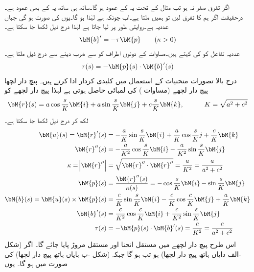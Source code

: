 اگر تفرق  صفر نہ ہو تب مثال  کے تحت یہ  کے عمود ہو گا۔ساتھ ہی ساتھ یہ  کے بھی عمود ہے۔درحقیقت اگر ہم  کا تفرق لیں تو ہمیں  ملتا ہے۔اب چونکہ  ہے لہٰذا  ہو گا۔یوں  کی صورت  ہو گی جہاں  عددیہ ہے۔روایتی طور پر  لیا جاتا ہے لہٰذا درج ذیل لکھا جا سکتا ہے۔
\begin{align}\label{مساوات_الاحصاء_مروڑ_الف}
\bM{b}'=-\tau \bM{p} \quad \quad (\kappa >0)
\end{align}
عددیہ تفاعل  کو  کی  کہتے ہیں۔مساوات   کے دونوں اطراف کو  سے ضرب دینے سے درج ذیل ملتا ہے۔
\begin{align}\label{مساوات_الاحصاء_مروڑ_ب}
\tau(s)=-\bM{p}(s)\cdot \bM{b}'(s)
\end{align}
درج بالا تصورات منحنیات کے استعمال میں کلیدی کردار ادا کرتے ہیں۔ 
\quad پیچ دار لچھا\\
پیچ دار لچھے  (مساوات ) کی لمبائی  حاصل ہوتی ہے لہٰذا پیچ دار لچھے کو
\begin{align*}
\bM{r}(s)=a\cos \frac{s}{K}\bM{i}+a\sin \frac{s}{K}\bM{j}+c\frac{s}{K}\bM{k}, \quad \quad \quad K=\sqrt{a^2+c^2} 
\end{align*}
لکھ کر درج ذیل لکھا جا سکتا ہے۔
\begin{align*}
\bM{u}(s)=\bM{r}'(s)&=-\frac{a}{K}\sin \frac{s}{K}\bM{i}+\frac{a}{K}\cos \frac{s}{K}j+\frac{c}{K}\bM{k}\\
\bM{r}''(s)&=-\frac{a}{K^2}\cos \frac{s}{K}\bM{i}-\frac{a}{K^2}\sin \frac{s}{K}\bM{j}\\
\kappa=\abs{\bM{r}''}&=\sqrt{\bM{r}''\cdot\bM{r}''}=\frac{a}{K^2}=\frac{a}{a^2+c^2}\\
\bM{p}(s)&=\frac{\bM{r}''(s)}{\kappa(s)}=-\cos \frac{s}{K}\bM{i}-\sin\frac{s}{K}\bM{j}\\
\bM{b}(s)=\bM{u}(s)\times \bM{p}(s)&=\frac{c}{K}\sin \frac{s}{K}\bM{i}-\frac{c}{K}\cos \frac{c}{K}\bM{j}+\frac{a}{K}\bM{k}\\
\bM{b}'(s)&=\frac{c}{K^2}\cos \frac{c}{K}\bM{i}+\frac{c}{K^2}\sin \frac{s}{K}\bM{j}\\
\tau(s)&=-\bM{p}(s)\cdot \bM{b}'(s)=\frac{c}{K^2}=\frac{c}{a^2+c^2}
\end{align*}
اس طرح پیچ دار لچھے میں  مستقل  انحنا اور مستقل مروڑ پایا جائے گا۔ اگر  (شکل -الف دایاں ہاتھ پیچ دار لچھا) ہو تب  ہو گا جبکہ  (شکل -ب  بایاں ہاتھ پیچ دار لچھا) کی صورت میں  ہو گا۔ 
یوں

